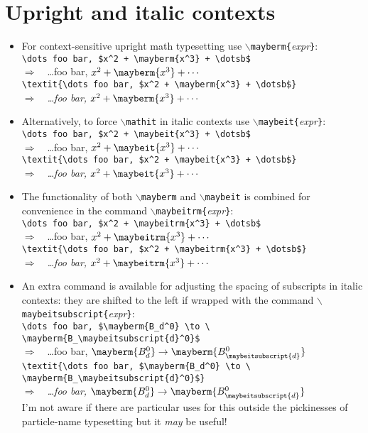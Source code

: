 \documentclass[12pt]{article}
\newcommand{\manifestsAs}{\ensuremath{\Rightarrow\quad}\xspace}
\newcommand{\texcommand}[1]{\texttt{\ensuremath{\backslash{}}{#1}}\xspace}
\newcommand{\texarg}[1]{\ensuremath{\!}\texttt{\{}\textit{#1}\texttt{\}}\xspace}
\newcommand{\maybermName}{\texcommand{mayberm}}
\newcommand{\maybeitName}{\texcommand{maybeit}}
\newcommand{\maybeitrmName}{\texcommand{maybeitrm}}
\newcommand{\maybeitsubscriptName}{\texcommand{maybeitsubscript}}
\begin{document}
\section{Upright and italic contexts}
\begin{itemize}
\item For context-sensitive upright math typesetting use \maybermName\texarg{expr}:\\
  {\verb|\dots foo bar, $x^2 + \mayberm{x^3} + \dotsb$|}\\ \manifestsAs {\dots foo bar, $x^2 + \mayberm{x^3} + \dotsb$}\\
  {\verb|\textit{\dots foo bar, $x^2 + \mayberm{x^3} + \dotsb$}|}\\ \manifestsAs \textit{\dots foo bar, $x^2 + \mayberm{x^3} + \dotsb$}

\item Alternatively, to force \texcommand{mathit} in italic contexts use \maybeitName\texarg{expr}:\\
  {\verb|\dots foo bar, $x^2 + \maybeit{x^3} + \dotsb$|}\\ \manifestsAs {\dots foo bar, $x^2 + \maybeit{x^3} + \dotsb$}\\
  {\verb|\textit{\dots foo bar, $x^2 + \maybeit{x^3} + \dotsb$}|}\\ \manifestsAs \textit{\dots foo bar, $x^2 + \maybeit{x^3} + \dotsb$}

\item The functionality of both \maybermName and \maybeitName is combined for convenience in the command \maybeitrmName\texarg{expr}:\\
  {\verb|\dots foo bar, $x^2 + \maybeitrm{x^3} + \dotsb$|}\\ \manifestsAs {\dots foo bar, $x^2 + \maybeitrm{x^3} + \dotsb$}\\
  {\verb|\textit{\dots foo bar, $x^2 + \maybeitrm{x^3} + \dotsb$}|}\\ \manifestsAs \textit{\dots foo bar, $x^2 + \maybeitrm{x^3} + \dotsb$}

\item An extra command is available for adjusting the spacing of subscripts in italic contexts: they are shifted
      to the left if wrapped with the command \maybeitsubscriptName\texarg{expr}:\\
  {\verb|\dots foo bar, $\mayberm{B_d^0} \to \|\\\verb|\mayberm{B_\maybeitsubscript{d}^0}$|}\\ \manifestsAs {\dots foo bar, $\mayberm{B_d^0} \to \mayberm{B_\maybeitsubscript{d}^0}$}\\
  {\verb|\textit{\dots foo bar, $\mayberm{B_d^0} \to \|\\\verb|\mayberm{B_\maybeitsubscript{d}^0}$}|}\\ \manifestsAs \textit{\dots foo bar, $\mayberm{B_d^0} \to \mayberm{B_\maybeitsubscript{d}^0}$}\\
  I'm not aware if there are particular uses for this outside the pickinesses of particle-name typesetting but it \emph{may} be useful!
\end{itemize}
\end{document}
